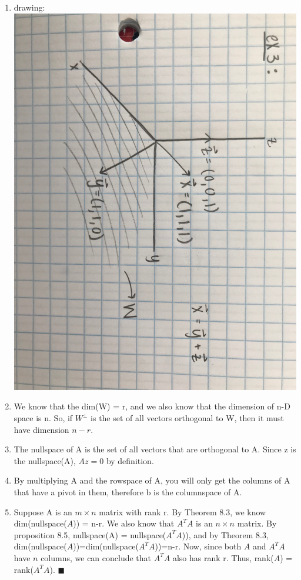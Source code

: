 \documentclass{article}
\newcommand*{\qed}{\hfill\ensuremath{\blacksquare}}
\begin{document}
\begin{enumerate}
\item drawing:\\
\includegraphics[scale=0.05]{exercise3}

\item We know that the dim(W) = r, and we also know that the dimension of n-D space is n. So, if $W^{\perp}$ is the set of all vectors orthogonal to W, then it must have dimension $n-r$. 

\item The nullspace of A is the set of all vectors that are orthogonal to A. Since z is the nullspace(A), $Az=0$ by definition. 

\item By multiplying A and the rowspace of A, you will only get the columns of A that have a pivot in them, therefore b is the columnspace of A. 

\item Suppose A is an $m \times n$ matrix with rank r. By Theorem 8.3, we know dim(nullspace($A$)) = n-r. We also know that $A^TA$ is an $n \times n$ matrix. By proposition 8.5, nullspace(A) = nullspace($A^TA$)), and by Theorem 8.3, dim(nullspace($A$))=dim(nullspace($A^TA$))=n-r. Now, since both $A$ and $A^TA$ have $n$ columns, we can conclude that $A^TA$ also has rank r. Thus, rank($A$) = rank($A^TA$). \qed


\end{enumerate}
\end{document}
